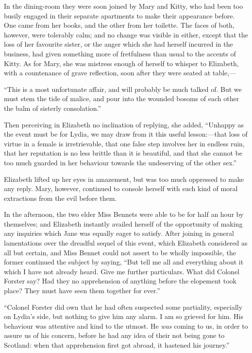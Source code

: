In the dining-room they were soon joined by Mary and Kitty, who had been too busily engaged in their separate apartments to make their appearance before. One came from her books, and the other from her toilette. The faces of both, however, were tolerably calm; and no change was visible in either, except that the loss of her favourite sister, or the anger which she had herself incurred in the business, had given something more of fretfulness than usual to the accents of Kitty. As for Mary, she was mistress enough of herself to whisper to Elizabeth, with a countenance of grave reflection, soon after they were seated at table,---

``This is a most unfortunate affair, and will probably be much talked of. But we must stem the tide of malice, and pour into the wounded bosoms of each other the balm of sisterly consolation.''

Then perceiving in Elizabeth no inclination of replying, she added, ``Unhappy as the event must be for Lydia, we may draw from it this useful lesson:---that loss of virtue in a female is irretrievable, that one false step involves her in endless ruin, that her reputation is no less brittle than it is beautiful, and that she cannot be too much guarded in her behaviour towards the undeserving of the other sex.''

Elizabeth lifted up her eyes in amazement, but was too much oppressed to make any reply. Mary, however, continued to console herself with such kind of moral extractions from the evil before them.

In the afternoon, the two elder Miss Bennets were able to be for half an hour by themselves; and Elizabeth instantly availed herself of the opportunity of making any inquiries which Jane was equally eager to satisfy. After joining in general lamentations over the dreadful sequel of this event, which Elizabeth considered as all but certain, and Miss Bennet could not assert to be wholly impossible, the former continued the subject by saying, ``But tell me all and everything about it which I have not already heard. Give me further particulars. What did Colonel Forster say? Had they no apprehension of anything before the elopement took place? They must have seen them together for ever.''

``Colonel Forster did own that he had often suspected some partiality, especially on Lydia's side, but nothing to give him any alarm. I am so grieved for him. His behaviour was attentive and kind to the utmost. He \textit{was} coming to us, in order to assure us of his concern, before he had any idea of their not being gone to Scotland: when that apprehension first got abroad, it hastened his journey.''


